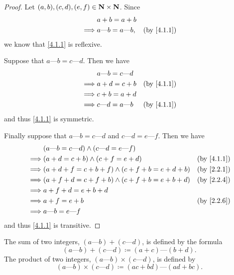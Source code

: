 \begin{proof}
  Let \((a, b), (c, d), (e, f) \in \mathbf{N} \times \mathbf{N}\).
  Since
  \begin{align*}
             & a + b = a + b                                               \\
    \implies & a \text{---} b = a \text{---} b, & \text{(by \cref{4.1.1})}
  \end{align*}
  we know that \cref{4.1.1} is reflexive.

  Suppose that \(a \text{---} b = c \text{---} d\).
  Then we have
  \begin{align*}
             & a \text{---} b = c \text{---} d                            \\
    \implies & a + d = c + b                   & \text{(by \cref{4.1.1})} \\
    \implies & c + b = a + d                                              \\
    \implies & c \text{---} d = a \text{---} b & \text{(by \cref{4.1.1})}
  \end{align*}
  and thus \cref{4.1.1} is symmetric.

  Finally suppose that \(a \text{---} b = c \text{---} d\) and \(c \text{---} d = e \text{---} f\).
  Then we have
  \begin{align*}
             & (a \text{---} b = c \text{---} d) \land (c \text{---} d = e \text{---} f)                            \\
    \implies & (a + d = c + b) \land (c + f = e + d)                                     & \text{(by \cref{4.1.1})} \\
    \implies & (a + d + f = c + b + f) \land (c + f + b = e + d + b)                     & \text{(by \cref{2.2.1})} \\
    \implies & (a + f + d = c + f + b) \land (c + f + b = e + b + d)                     & \text{(by \cref{2.2.4})} \\
    \implies & a + f + d = e + b + d                                                                                \\
    \implies & a + f = e + b                                                             & \text{(by \cref{2.2.6})} \\
    \implies & a \text{---} b = e \text{---} f
  \end{align*}
  and thus \cref{4.1.1} is transitive.
\end{proof}

\begin{definition}\label{4.1.2}
  The sum of two integers, \((a \text{---} b) + (c \text{---} d)\), is defined by the formula
  \[
    (a \text{---} b) + (c \text{---} d) \coloneqq (a + c) \text{---} (b + d).
  \]
  The product of two integers, \((a \text{---} b) \times (c \text{---} d)\), is defined by
  \[
    (a \text{---} b) \times (c \text{---} d) \coloneqq (ac + bd) \text{---} (ad + bc).
  \]
\end{definition}

